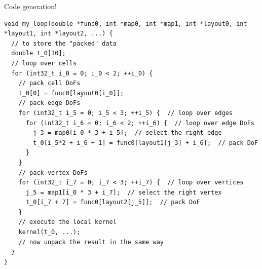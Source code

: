 \documentclass[aspectratio=169]{beamer}
\begin{document}
\begin{frame}[fragile]{Code generation!}
  \begin{tcolorbox}
    \begin{verbatim}
void my_loop(double *func0, int *map0, int *map1, int *layout0, int *layout1, int *layout2, ...) {
  // to store the "packed" data
  double t_0[10];
  // loop over cells
  for (int32_t i_0 = 0; i_0 < 2; ++i_0) {
    // pack cell DoFs
    t_0[0] = func0[layout0[i_0]];
    // pack edge DoFs
    for (int32_t i_5 = 0; i_5 < 3; ++i_5) {  // loop over edges
      for (int32_t i_6 = 0; i_6 < 2; ++i_6) {  // loop over edge DoFs
        j_3 = map0[i_0 * 3 + i_5];  // select the right edge
        t_0[i_5*2 + i_6 + 1] = func0[layout1[j_3] + i_6];  // pack DoF
      }
    }
    // pack vertex DoFs
    for (int32_t i_7 = 0; i_7 < 3; ++i_7) {  // loop over vertices
      j_5 = map1[i_0 * 3 + i_7];  // select the right vertex
      t_0[i_7 + 7] = func0[layout2[j_5]];  // pack DoF
    }
    // execute the local kernel
    kernel(t_0, ...);
    // now unpack the result in the same way
  }
}
    \end{verbatim}
  \end{tcolorbox}
\end{frame}

\end{document}
